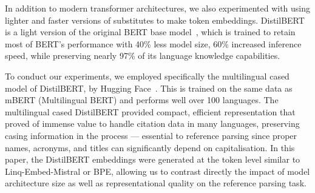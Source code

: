 In addition to modern transformer architectures, we also experimented with using lighter and faster versions of substitutes to make token embeddings. DistilBERT~\cite{sanh2019distilbert} is a light version of the original BERT base model~\cite{2019-bert}, which is trained to retain most of BERT's performance with 40\% less model size, 60\% increased inference speed, while preserving nearly 97\% of its language knowledge capabilities.

To conduct our experiments, we employed specifically the multilingual cased model of DistilBERT, by Hugging Face~\cite{distilbert-multilingual}. This is trained on the same data as mBERT (Multilingual BERT) and performs well over 100 languages. The multilingual cased DistilBERT provided compact, efficient representation that proved of immense value to handle citation data in many languages, preserving casing information in the process — essential to reference parsing since proper names, acronyms, and titles can significantly depend on capitalisation.
In this paper, the DistilBERT embeddings were generated at the token level similar to Linq-Embed-Mistral or BPE, allowing us to contrast directly the impact of model architecture size as well as representational quality on the reference parsing task.

